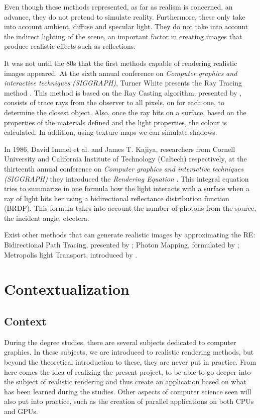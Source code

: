 \documentclass[titlepage,12pt]{report}
\begin{document}
Even though these methods represented, as far as realism is concerned, an advance, they do not pretend to simulate reality. Furthermore, these only take into account ambient, diffuse and specular light. They do not take into account the indirect lighting of the scene, an important factor in creating images that produce realistic effects such as reflections.

It was not until the 80s that the first methods capable of rendering realistic images appeared. At the sixth annual conference on \textit{Computer graphics and interactive techniques (SIGGRAPH)}, Turner White presents the Ray Tracing method \citep{Whitted1980}. This method is based on the Ray Casting algorithm, presented by \citep{Appel1968}, consists of trace rays from the observer to all pixels, on for each one, to determine the closest object. Also, once the ray hits on a surface, based on the properties of the materials defined and the light properties, the colour is calculated. In addition, using texture maps we can simulate shadows.

In 1986, David Immel et al. and James T. Kajiya, researchers from Cornell University and California Institute of Technology (Caltech) respectively, at the thirteenth annual conference on \textit{Computer graphics and interactive techniques (SIGGRAPH)} they introduced the \textit{Rendering Equation} \citep{Kajiya1986, Immel1986}. This integral equation tries to summarize in one formula how the light interacts with a surface when a ray of light hits her using a bidirectional reflectance distribution function (BRDF). This formula takes into account the number of photons from the source, the incident angle, etcetera.

Exist other methods that can generate realistic images by approximating the RE: Bidirectional Path Tracing, presented by \citep{Lafortune1993}; Photon Mapping, formulated by \citep{Jensen1996}; Metropolis light Transport, introduced by \citep{Veach1997}.

\section{Contextualization}

\subsection{Context} \label{ref:contexto}

During the degree studies, there are several subjects dedicated to computer graphics. In these subjects, we are introduced to realistic rendering methods, but beyond the theoretical introduction to these, they are never put in practice. From here comes the idea of realizing the present project, to be able to go deeper into the subject of realistic rendering and thus create an application based on what has been learned during the studies. Other aspects of computer science seen will also put into practice, such as the creation of parallel applications on both CPUs and GPUs.
\end{document}
